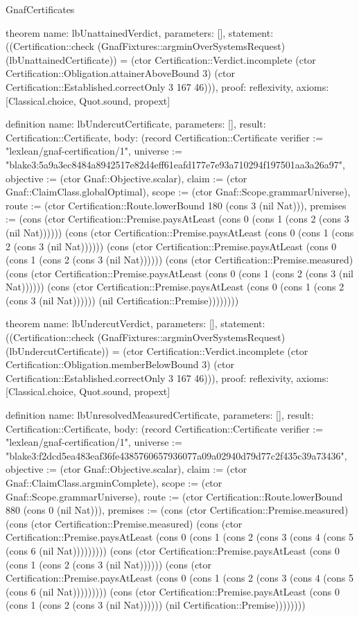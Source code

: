 \begin{lexlean}{GnafCertificates}
\begin{semanticmodule}
theorem{
  name: lbUnattainedVerdict,
  parameters: [],
  statement: ((Certification::check (GnafFixtures::argminOverSystemsRequest) (lbUnattainedCertificate)) = (ctor Certification::Verdict.incomplete (ctor Certification::Obligation.attainerAboveBound 3) (ctor Certification::Established.correctOnly 3 167 46))),
  proof: reflexivity{},
  axioms: [Classical.choice, Quot.sound, propext]
}

definition{
  name: lbUndercutCertificate,
  parameters: [],
  result: Certification::Certificate,
  body: (record Certification::Certificate {verifier := "lexlean/gnaf-certification/1", universe := "blake3:5a9a3ec8484a8942517e82d4eff61eafd177e7e93a710294f197501aa3a26a97", objective := (ctor Gnaf::Objective.scalar), claim := (ctor Gnaf::ClaimClass.globalOptimal), scope := (ctor Gnaf::Scope.grammarUniverse), route := (ctor Certification::Route.lowerBound 180 (cons 3 (nil Nat))), premises := (cons (ctor Certification::Premise.paysAtLeast (cons 0 (cons 1 (cons 2 (cons 3 (nil Nat)))))) (cons (ctor Certification::Premise.paysAtLeast (cons 0 (cons 1 (cons 2 (cons 3 (nil Nat)))))) (cons (ctor Certification::Premise.paysAtLeast (cons 0 (cons 1 (cons 2 (cons 3 (nil Nat)))))) (cons (ctor Certification::Premise.measured) (cons (ctor Certification::Premise.paysAtLeast (cons 0 (cons 1 (cons 2 (cons 3 (nil Nat)))))) (cons (ctor Certification::Premise.paysAtLeast (cons 0 (cons 1 (cons 2 (cons 3 (nil Nat)))))) (nil Certification::Premise)))))))})
}

theorem{
  name: lbUndercutVerdict,
  parameters: [],
  statement: ((Certification::check (GnafFixtures::argminOverSystemsRequest) (lbUndercutCertificate)) = (ctor Certification::Verdict.incomplete (ctor Certification::Obligation.memberBelowBound 3) (ctor Certification::Established.correctOnly 3 167 46))),
  proof: reflexivity{},
  axioms: [Classical.choice, Quot.sound, propext]
}

definition{
  name: lbUnresolvedMeasuredCertificate,
  parameters: [],
  result: Certification::Certificate,
  body: (record Certification::Certificate {verifier := "lexlean/gnaf-certification/1", universe := "blake3:f2dcd5ea483eaf36fe4385760657936077a09a02940d79d77c2f435c39a73436", objective := (ctor Gnaf::Objective.scalar), claim := (ctor Gnaf::ClaimClass.argminComplete), scope := (ctor Gnaf::Scope.grammarUniverse), route := (ctor Certification::Route.lowerBound 880 (cons 0 (nil Nat))), premises := (cons (ctor Certification::Premise.measured) (cons (ctor Certification::Premise.measured) (cons (ctor Certification::Premise.paysAtLeast (cons 0 (cons 1 (cons 2 (cons 3 (cons 4 (cons 5 (cons 6 (nil Nat))))))))) (cons (ctor Certification::Premise.paysAtLeast (cons 0 (cons 1 (cons 2 (cons 3 (nil Nat)))))) (cons (ctor Certification::Premise.paysAtLeast (cons 0 (cons 1 (cons 2 (cons 3 (cons 4 (cons 5 (cons 6 (nil Nat))))))))) (cons (ctor Certification::Premise.paysAtLeast (cons 0 (cons 1 (cons 2 (cons 3 (nil Nat)))))) (nil Certification::Premise)))))))})
}


\end{semanticmodule}
\end{lexlean}
